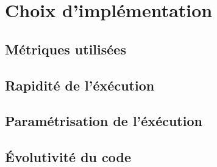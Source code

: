 \section{Choix d'implémentation}

\subsection{Métriques utilisées}

\subsection{Rapidité de l'éxécution}

\subsection{Paramétrisation de l'éxécution}

\subsection{\'Evolutivité du code}
